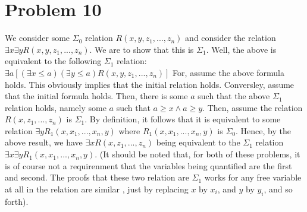 \documentclass{article}
\theoremstyle{definition}
\begin{document}
\section*{Problem 10}
We consider some $\Sigma_0$ relation $R(x,y,z_1,...,z_n)$ and consider the relation $\exists x\exists yR(x,y,z_1,...,z_n)$. We are to show that this is 
$\Sigma_1$. Well, the above is equivalent to the following $\Sigma_1$ relation:\newline $\exists a[(\exists x\le a)(\exists y\le a)R(x,y,z_1,...,z_n)]$
\newline For, assume the above formula holds. This obviously implies that the initial relation holds. Conversley, assume that the initial formula holds. 
Then, there is some $a$ such that the above $\Sigma_1$ relation holds, namely some $a$ such that $a\ge x\wedge a\ge y$. Then, assume the relation 
$R(x,z_1,...,z_n)$ is $\Sigma_1$. By definition, it follows that it is equivalent to some relation $\exists yR_1(x,x_1,...,x_n,y)$ where 
$R_1(x,x_1,...,x_n,y)$ is $\Sigma_0$. Hence, by the above result, we have $\exists xR(x,z_1,...,z_n)$ being equivalent to the $\Sigma_1$ relation 
$\exists x\exists yR_1(x,x_1,...,x_n,y)$. (It should be noted that, for both of these problems, it is of course not a requirenment that the variables 
being quantified are the first and second. The proofs that these two relation are $\Sigma_1$ works for any free variable at all in the relation are similar
, just by replacing $x$ by $x_i$, and $y$ by $y_i$, and so forth).\newline
\end{document}
